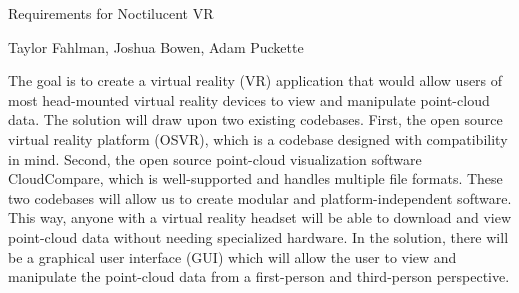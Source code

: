 \documentclass[titlepage]{article}
\begin{document}
\begin{titlepage}
\centering
{\Huge Requirements for Noctilucent VR\par}
{\Large Taylor Fahlman, Joshua Bowen, Adam Puckette}
\abstract

The goal is to create a virtual reality (VR) application that would allow users of most head-mounted virtual reality devices to view and manipulate point-cloud data. The solution will draw upon two existing codebases. First, the open source virtual reality platform (OSVR), which is a codebase designed with compatibility in mind. Second, the open source point-cloud visualization software CloudCompare, which is well-supported and handles multiple file formats. These two codebases will allow us to create modular and platform-independent software. This way, anyone with a virtual reality headset will be able to download and view point-cloud data without needing specialized hardware. In the solution, there will be a graphical user interface (GUI) which will allow the user to view and manipulate the point-cloud data from a first-person and third-person perspective. 

\end{titlepage}
\end{document}
